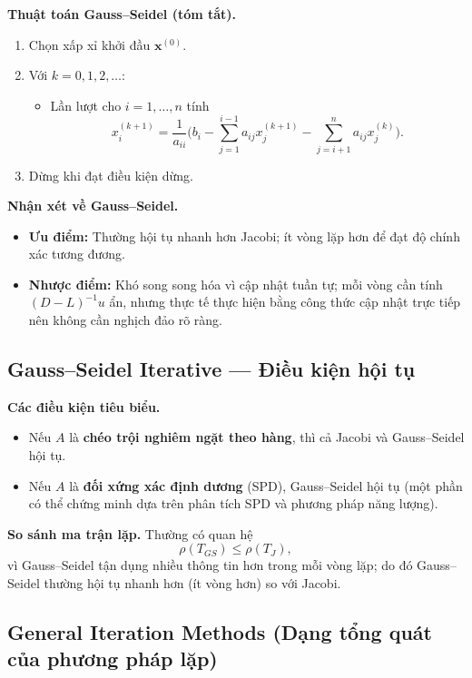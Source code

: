 \textbf{Thuật toán Gauss--Seidel (tóm tắt).}
\begin{enumerate}
  \item Chọn xấp xỉ khởi đầu $\mathbf{x}^{(0)}$.
  \item Với $k=0,1,2,\dots$:
    \begin{itemize}
      \item Lần lượt cho $i=1,\dots,n$ tính
        \[
        x_i^{(k+1)} = \frac{1}{a_{ii}} \Big( b_i - \sum_{j=1}^{i-1} a_{ij} x_j^{(k+1)} - \sum_{j=i+1}^{n} a_{ij} x_j^{(k)}\Big).
        \]
    \end{itemize}
  \item Dừng khi đạt điều kiện dừng.
\end{enumerate}

\textbf{Nhận xét về Gauss--Seidel.}
\begin{itemize}
  \item \textbf{Ưu điểm:} Thường hội tụ nhanh hơn Jacobi; ít vòng lặp hơn để đạt độ chính xác tương đương.
  \item \textbf{Nhược điểm:} Khó song song hóa vì cập nhật tuần tự; mỗi vòng cần tính $(D-L)^{-1}u$ ẩn, nhưng thực tế thực hiện bằng công thức cập nhật trực tiếp nên không cần nghịch đảo rõ ràng.
\end{itemize}

\subsection{Gauss--Seidel Iterative — Điều kiện hội tụ}

\textbf{Các điều kiện tiêu biểu.}
\begin{itemize}
  \item Nếu $A$ là \textbf{chéo trội nghiêm ngặt theo hàng}, thì cả Jacobi và Gauss--Seidel hội tụ.
  \item Nếu $A$ là \textbf{đối xứng xác định dương} (SPD), Gauss--Seidel hội tụ (một phần có thể chứng minh dựa trên phân tích SPD và phương pháp năng lượng).
\end{itemize}

\textbf{So sánh ma trận lặp.}
Thường có quan hệ
\[
\rho(T_{GS}) \le \rho(T_J),
\]
vì Gauss--Seidel tận dụng nhiều thông tin hơn trong mỗi vòng lặp; do đó Gauss--Seidel thường hội tụ nhanh hơn (ít vòng hơn) so với Jacobi.

\subsection{General Iteration Methods (Dạng tổng quát của phương pháp lặp)}

